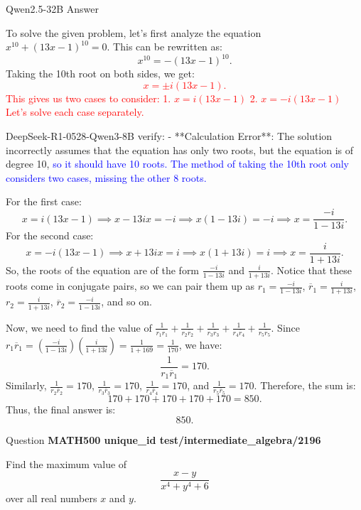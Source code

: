 \begin{answerbox}{Qwen2.5-32B Answer}

To solve the given problem, let's first analyze the equation $x^{10} + (13x - 1)^{10} = 0$. This can be rewritten as:
\[x^{10} = -(13x - 1)^{10}.\]
Taking the 10th root on both sides, we get:
\textcolor{red}{\[x = \pm i (13x - 1).\]
This gives us two cases to consider:
1. $x = i (13x - 1)$
2. $x = -i (13x - 1)$
Let's solve each case separately.}
\begin{tcolorbox}[
    colback=blue!5!white,         %
    colframe=blue!40!white,       %
]
DeepSeek-R1-0528-Qwen3-8B verify:  - **Calculation Error**: The solution incorrectly assumes that the equation has only two roots, but the equation is of degree 10, \textcolor{blue}{so it should have 10 roots. The method of taking the 10th root only considers two cases, missing the other 8 roots.}

\end{tcolorbox}

For the first case:
\[x = i (13x - 1)  \implies x - 13ix = -i \implies x(1 - 13i) = -i \implies x = \frac{-i}{1 - 13i}.\]
For the second case:
\[x = -i (13x - 1) \implies x + 13ix = i \implies x(1 + 13i) = i \implies x = \frac{i}{1 + 13i}.\]
So, the roots of the equation are of the form $\frac{-i}{1 - 13i}$ and $\frac{i}{1 + 13i}$. Notice that these roots come in conjugate pairs, so we can pair them up as $r_1 = \frac{-i}{1 - 13i}$, $\overline{r}_1 = \frac{i}{1 + 13i}$, $r_2 = \frac{i}{1 + 13i}$, $\overline{r}_2 = \frac{-i}{1 - 13i}$, and so on.



Now, we need to find the value of $\frac{1}{r_1\overline{r}_1} + \frac{1}{r_2\overline{r}_2} + \frac{1}{r_3\overline{r}_3} + \frac{1}{r_4\overline{r}_4} + \frac{1}{r_5\overline{r}_5}$. Since $r_1\overline{r}_1 = \left(\frac{-i}{1 - 13i}\right)\left(\frac{i}{1 + 13i}\right) = \frac{1}{1 + 169} = \frac{1}{170}$, we have:
\[\frac{1}{r_1\overline{r}_1} = 170.\]
Similarly, $\frac{1}{r_2\overline{r}_2} = 170$, $\frac{1}{r_3\overline{r}_3} = 170$, $\frac{1}{r_4\overline{r}_4} = 170$, and $\frac{1}{r_5\overline{r}_5} = 170$. Therefore, the sum is:
\[170 + 170 + 170 + 170 + 170 = 850.\]
Thus, the final answer is:
\[\boxed{850}.\]

\end{answerbox}

\begin{questionbox}{ Question }
\textbf{MATH500 unique\_id test/intermediate\_algebra/2196}

Find the maximum value of
\[\frac{x - y}{x^4 + y^4 + 6}\]over all real numbers $x$ and $y.$

\end{questionbox}


